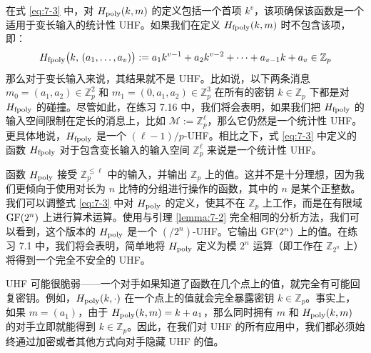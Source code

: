 \begin{snote}
在式 \ref{eq:7-3} 中，对 $H_{\rm poly}(k,m)$ 的定义包括一个首项 $k^v$，该项确保该函数是一个适用于变长输入的统计性 UHF。如果我们在定义 $H_{\rm fpoly}(k,m)$ 时不包含该项，即： 
\begin{equation}\label{eq:7-5}
H_{\rm fpoly}\big(k,\,(a_1,\dots,a_v)\big):=a_1k^{v-1}+a_2k^{v-2}+\cdots+a_{v-1}k+a_v\in\mathbb{Z}_p
\end{equation}
那么对于变长输入来说，其结果就不是 UHF。比如说，以下两条消息 $m_0=(a_1,a_2)\in\mathbb{Z}^2_p$ 和 $m_1=(0,a_1,a_2)\in\mathbb{Z}^3_p$ 在所有的密钥 $k\in\mathbb{Z}_p$ 下都是对 $H_{\rm fpoly}$ 的碰撞。尽管如此，在练习 7.16 中，我们将会表明，如果我们把 $H_{\rm fpoly}$ 的输入空间限制在定长的消息上，比如 $\mathcal{M}:=\mathbb{Z}_p^\ell$，那么它仍然是一个统计性 UHF。更具体地说，$H_{\rm fpoly}$ 是一个 $(\ell-1)/p$-UHF。相比之下，式 \ref{eq:7-3} 中定义的函数 $H_{\rm fpoly}$ 对于包含变长输入的输入空间 $\mathbb{Z}_p^\ell$ 来说是一个统计性 UHF。
\end{snote}

\begin{remark}\label{remark:7-1}
函数 $H_{\rm poly}$ 接受 $\mathbb{Z}^{\leq\ell}_p$ 中的输入，并输出 $\mathbb{Z}_p$ 上的值。这并不是十分理想，因为我们更倾向于使用对长为 $n$ 比特的分组进行操作的函数，其中的 $n$ 是某个正整数。我们可以调整式 \ref{eq:7-3} 中对 $H_{\rm poly}$ 的定义，使其不在 $\mathbb{Z}_p$ 上工作，而是在有限域 ${\rm GF}(2^n)$ 上进行算术运算。使用与引理 \ref{lemma:7-2} 完全相同的分析方法，我们可以看到，这个版本的 $H_{\rm poly}$ 是一个 ${(/2^n)}$-UHF。它输出 ${\rm GF}(2^n)$ 上的值。在练习 7.1 中，我们将会表明，简单地将 $H_{\rm poly}$ 定义为模 $2^n$ 运算（即工作在 $\mathbb{Z}_{2^n}$ 上）将得到一个完全不安全的 UHF。
\end{remark}

\begin{snote}
UHF 可能很脆弱——一个对手如果知道了函数在几个点上的值，就完全有可能回复密钥。例如，$H_{\rm poly}(k,\cdot)$ 在一个点上的值就会完全暴露密钥 $k\in\mathbb{Z}_p$。事实上，如果 $m=(a_1)$，由于 $H_{\rm poly}(k,m)=k+a_1$，那么同时拥有 $m$ 和 $H_{\rm poly}(k,m)$ 的对手立即就能得到 $k\in\mathbb{Z}_p$。因此，在我们对 UHF 的所有应用中，我们都必须始终通过加密或者其他方式向对手隐藏 UHF 的值。
\end{snote}

